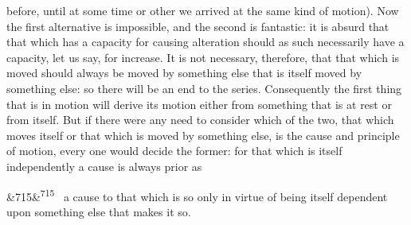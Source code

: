 \documentclass[12pt]{article}
\newcommand{\para}[1][]{\par\noindent\ifx&#1&\else\textsuperscript{\footnotesize #1}~\fi}
\begin{document}
before, until at some time or other we arrived at the same kind of motion). Now the first alternative is impossible, and the second is fantastic: it is absurd that that which has a capacity for causing alteration should as such necessarily have a capacity, let us say, for increase. It is not necessary, therefore, that that which is moved should always be moved by something else that is itself moved by something else: so there will be an end to the series. Consequently the first thing that is in motion will derive its motion either from something that is at rest or from itself. But if there were any need to consider which of the two, that which moves itself or that which is moved by something else, is the cause and principle of motion, every one would decide the former: for that which is itself independently a cause is always prior as

\para[715] a cause to that which is so only in virtue of being itself dependent upon something else that makes it so.
\end{document}
